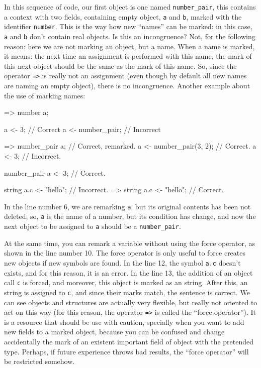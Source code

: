 \documentclass{article}
\begin{document}
In this sequence of code, our first object is one named \texttt{number\_pair},
this contains a context with two fields, containing empty object, \texttt{a} and
\texttt{b}, marked with the identifier \texttt{number}. This is the way how new
``names'' can be marked: in this case, \texttt{a} and \texttt{b} don't contain
real objects. Is this an incongruence? Not, for the following reason: here we
are not marking an object, but a name. When a name is marked, it means: the next
time an assignment is performed with this name, the mark of this next object
should be the same as the mark of this name. So, since the operator \texttt{=>}
is really not an assignment (even though by default all new names are naming an
empty object), there is no incongruence. Another example about the use of
marking names:

\begin{faupp2}
  => number a;

  a <- 3; // Correct
  a <- number_pair; // Incorrect

  => number_pair a; // Correct, remarked.
  a <- number_pair(3, 2); // Correct.
  a <- 3; // Incorrect.

  number_pair a <-  3; // Correct.

  string a.c <- "hello"; // Incorrect.
  => string a.c <- "hello"; // Correct.
\end{faupp2}

In the line number 6, we are remarking \texttt{a}, but its original contents has
been not deleted, so, \texttt{a} is the name of a number, but its condition has
change, and now the next object to be assigned to \texttt{a} should be a
\texttt{number\_pair}.

At the same time, you can remark a variable without using the force operator, as
shown in the line number 10. The force operator is only useful to force \faupp
creates new objects if new symbols are found. In the line 12, the symbol
\texttt{a.c} doesn't exists, and for this reason, it is an error. In the line
13, the addition of an object call \texttt{c} is forced, and moreover, this
object is marked as an string. After this, an string is assigned to \texttt{c},
and since their marks match, the sentence is correct. We can see objects and
structures are actually very flexible, but really not oriented to act on this
way (for this reason, the operator \texttt{=>} is called the ``force
operator''). It is a resource that should be use with caution, specially when
you want to add new fields to a marked object, because you can be confused and
change accidentally the mark of an existent important field of object with the
pretended type. Perhaps, if future experience throws bad results, the ``force
operator'' will be restricted somehow.
\end{document}

